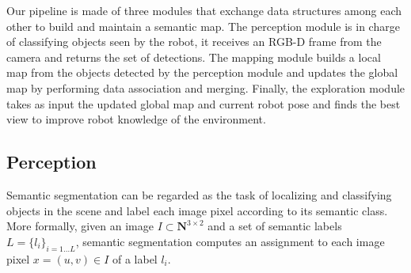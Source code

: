\documentclass{article}
\begin{document}
	Our pipeline is made of three modules that exchange data structures among each other to build and maintain a semantic map. The perception module is in charge of classifying objects seen by the robot, it receives an RGB-D frame from the camera and returns the set of detections. The mapping module builds a local map from the objects detected by the perception module and updates the global map by performing data association and merging. Finally, the exploration module takes as input the updated global map and current robot pose and finds the best view to improve robot knowledge of the environment.
	
	\subsection{Perception}
	
%	
	
	Semantic segmentation can be regarded as the task of localizing and classifying objects in the scene and label each image pixel according to its semantic class.
	More formally, given an image $I \subset \mathbf{N}^{3 \times 2}$ and a set of semantic labels $L = \{l_i\}_{i=1 \dots L}$, semantic segmentation computes an assignment to each image pixel $x = (u,v) \in I$ of a label $l_i$.
	
\end{document}
